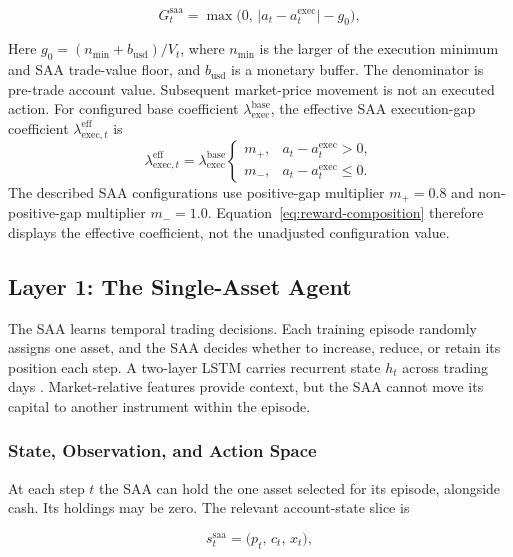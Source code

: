 \begin{equation}
G_t^{\text{saa}} = \max\big(0,\, \lvert a_t - a_t^{\text{exec}} \rvert - g_0\big),
\label{eq:execution-gap-saa}
\end{equation}

Here \(g_0=(n_{\min}+b_{\text{usd}})/V_t\), where \(n_{\min}\) is the larger of the execution minimum and SAA trade-value floor, and \(b_{\text{usd}}\) is a monetary buffer. The denominator is pre-trade account value. Subsequent market-price movement is not an executed action. For configured base coefficient \(\lambda_{\mathrm{exec}}^{\mathrm{base}}\), the effective SAA execution-gap coefficient \(\lambda_{\mathrm{exec},t}^{\mathrm{eff}}\) is
\begin{equation}
\lambda_{\mathrm{exec},t}^{\mathrm{eff}}=
\lambda_{\mathrm{exec}}^{\mathrm{base}}
\begin{cases}
m_+,&a_t-a_t^{\mathrm{exec}}>0,\\
m_-,&a_t-a_t^{\mathrm{exec}}\leq0.
\end{cases}
\label{eq:execution-gap-coefficient}
\end{equation}
The described SAA configurations use positive-gap multiplier \(m_+=0.8\) and non-positive-gap multiplier \(m_-=1.0\). Equation~\eqref{eq:reward-composition} therefore displays the effective coefficient, not the unadjusted configuration value.


\subsection{Layer 1: The Single-Asset Agent}
\label{sec:saa}

The SAA learns temporal trading decisions. Each training episode randomly assigns one asset, and the SAA decides whether to increase, reduce, or retain its position each step. A two-layer LSTM carries recurrent state \(h_t\) across trading days \cite{Hochreiter1997}. Market-relative features provide context, but the SAA cannot move its capital to another instrument within the episode.

\subsubsection{State, Observation, and Action Space}

At each step $t$ the SAA can hold the one asset selected for its episode, alongside cash. Its holdings may be zero. The relevant account-state slice is

\begin{equation}
s_t^{\text{saa}} = \big(p_t,\, c_t,\, x_t\big),
\label{eq:saa-account-state}
\end{equation}

